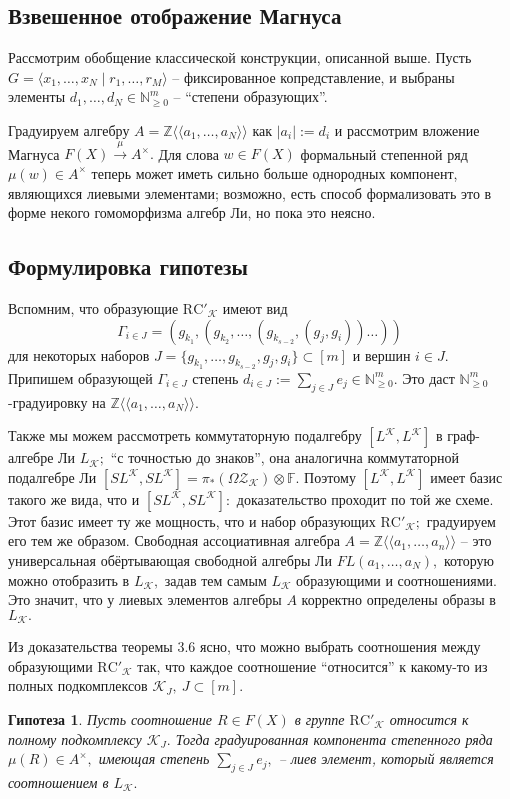 \documentclass[10pt,a4paper]{article}
\def\ZZ{\mathbb{Z}}
\def\FF{\mathbb{F}}
\def\NN{\mathbb{N}}
\def\Nm{\NN_{\geq 0}^m}
\def\RC{\mathrm{RC}}
\def\Z{\mathcal{Z}}
\def\K{\mathcal{K}}
\def\ZK{\Z_\K}
\def\OZK{\Omega\ZK}
\newtheorem{cnj}[thm]{Гипотеза}
\theoremstyle{definition}
\begin{document}
\subsection{Взвешенное отображение Магнуса}
Рассмотрим обобщение классической конструкции, описанной выше. Пусть $G=\langle x_1,\dots, x_N\mid r_1,\dots, r_M\rangle$ -- фиксированное копредставление, и выбраны элементы $d_1,\dots, d_N\in \Nm$ -- ``степени образующих''. 

Градуируем алгебру $A=\ZZ\langle\!\langle a_1,\dots, a_N\rangle\!\rangle$ как $|a_i|:=d_i$ и рассмотрим вложение Магнуса $F(X)\overset{\mu}{\longrightarrow} A^\times.$ Для слова $w\in F(X)$ формальный степенной ряд $\mu(w)\in A^\times$ теперь может иметь сильно больше однородных компонент, являющихся лиевыми элементами; возможно, есть способ формализовать это в форме некого гомоморфизма алгебр Ли, но пока это неясно.
\subsection{Формулировка гипотезы}
Вспомним, что образующие $\RC'_\K$ имеют вид
$$\Gamma_{i\in J}=(g_{k_1},(g_{k_2},\dots,(g_{k_{s-2}},(g_j,g_i))\dots))$$ для некоторых наборов $J=\{g_{k_1},\dots,g_{k_{s-2}},g_j,g_i\}\subset [m]$ и вершин $i\in J.$ Припишем образующей $\Gamma_{i\in J}$ степень $d_{i\in J}:=\sum_{j\in J}e_j\in \Nm.$ Это даст $\Nm$-градуировку на $\ZZ\langle\!\langle a_1,\dots, a_N\rangle\!\rangle.$

Также мы можем рассмотреть коммутаторную подалгебру $[L^\K,L^\K]$ в граф-алгебре Ли $L_\K;$ ``с точностью до знаков'', она аналогична коммутаторной подалгебре Ли $[SL^\K,SL^\K]=\pi_*(\OZK)\otimes\FF.$ Поэтому $[L^\K,L^\K]$ имеет базис такого же вида, что и $[SL^\K,SL^\K]:$ доказательство проходит по той же схеме. Этот базис имеет ту же мощность, что и набор образующих $\RC'_\K;$ градуируем его тем же образом. Свободная ассоциативная алгебра $A=\ZZ\langle\!\langle a_1,\dots, a_n\rangle\!\rangle$ -- это универсальная обёртывающая свободной алгебры Ли $FL(a_1,\dots,a_N),$ которую можно отобразить в $L_\K,$ задав тем самым $L_\K$ образующими и соотношениями. Это значит, что у лиевых элементов алгебры $A$ корректно определены образы в $L_\K.$

Из доказательства теоремы 3.6 ясно, что можно выбрать соотношения между образующими $\RC'_\K$ так, что каждое соотношение ``относится'' к какому-то из полных подкомплексов $\K_J,~J\subset[m].$
\begin{cnj} Пусть соотношение $R\in F(X)$ в группе $\RC'_\K$ относится к полному подкомплексу $\K_J.$ Тогда градуированная компонента степенного ряда $\mu(R)\in A^\times,$ имеющая степень $\sum_{j\in J} e_j,$ -- лиев элемент, который является соотношением в $L_\K.$
\end{cnj}
\end{document}
